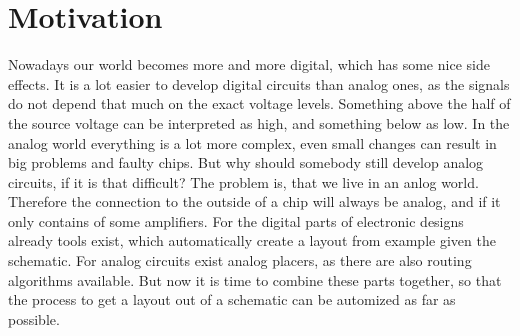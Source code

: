 \chapter{Motivation}

Nowadays our world becomes more and more digital, which has some nice side effects. It is a lot easier to develop digital circuits than analog ones, as the signals do not depend that much on the exact voltage levels. Something above the half of the source voltage can be interpreted as high, and something below as low. In the analog world everything is a lot more complex, even small changes can result in big problems and faulty chips. But why should somebody still develop analog circuits, if it is that difficult? The problem is, that we live in an anlog world. Therefore the connection to the outside of a chip will always be analog, and if it only contains of some amplifiers. For the digital parts of electronic designs already tools exist, which automatically create a layout from example given the schematic. For analog circuits exist analog placers, as there are also routing algorithms available. But now it is time to combine these parts together, so that the process to get a layout out of a schematic can be automized as far as possible.